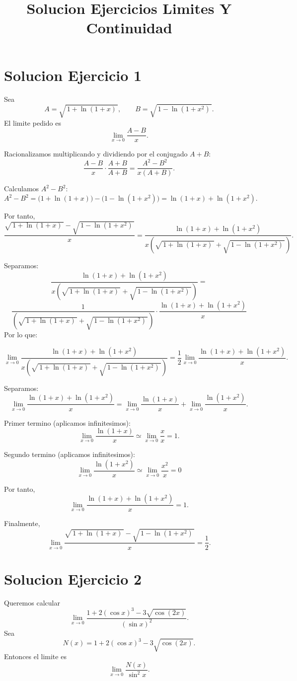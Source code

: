 \documentclass[12pt]{article}
\title{Solucion Ejercicios Limites Y Continuidad}
\author{}
\begin{document}
\maketitle

\section*{Solucion Ejercicio 1}

Sea
\[
A=\sqrt{\,1+\ln(1+x)\,},\qquad B=\sqrt{\,1-\ln(1+x^2)\,}.
\]
El limite pedido es
\[
\lim_{x\to 0}\frac{A-B}{x}.
\]

Racionalizamos multiplicando y dividiendo por el conjugado $A+B$:
\[
\frac{A-B}{x}\cdot \frac{A+B}{A+B}
=\frac{A^2-B^2}{x(A+B)}.
\]

Calculamos $A^2-B^2$:
\[
A^2-B^2=\bigl(1+\ln(1+x)\bigr)-\bigl(1-\ln(1+x^2)\bigr)
=\ln(1+x)+\ln(1+x^2).
\]

Por tanto,
\[
\frac{\sqrt{\,1+\ln(1+x)\,}-\sqrt{\,1-\ln(1+x^2)\,}}{x}
=\frac{\ln(1+x)+\ln(1+x^2)}{x\left(\sqrt{\,1+\ln(1+x)\,}+\sqrt{\,1-\ln(1+x^2)\,}\right)}.
\]

Separamos:
\[
\frac{\ln(1+x)+\ln(1+x^2)}{x\left(\sqrt{\,1+\ln(1+x)\,}+\sqrt{\,1-\ln(1+x^2)\,}\right)} = 
\]
\[
\frac{1}{\left(\sqrt{\,1+\ln(1+x)\,}+\sqrt{\,1-\ln(1+x^2)\,}\right)} \cdot \frac{\ln(1+x)+\ln(1+x^2)}{x}
\]
Por lo que:

\[
\lim_{x\to 0}
\frac{\ln(1+x)+\ln(1+x^2)}{x\left(\sqrt{\,1+\ln(1+x)\,}+\sqrt{\,1-\ln(1+x^2)\,}\right)}
=
\frac{1}{2}
\lim_{x\to 0}\frac{\ln(1+x)+\ln(1+x^2)}{x}.
\]

Separamos:
\[
\lim_{x\to 0}\frac{\ln(1+x)+\ln(1+x^2)}{x}
=
\lim_{x\to 0}\frac{\ln(1+x)}{x}
+
\lim_{x\to 0}\frac{\ln(1+x^2)}{x}.
\]

Primer termino (aplicamos infinitesimos):
\[
\lim_{x\to 0}\frac{\ln(1+x)}{x}\simeq\lim_{x\to 0}\frac{x}{x} = 1.
\]

Segundo termino (aplicamos infinitesimos):
\[
\lim_{x\to 0}\frac{\ln(1+x^2)}{x} \simeq \lim_{x\to 0} \frac{x^2}{x} = 0
\]

Por tanto,
\[
\lim_{x\to 0}\frac{\ln(1+x)+\ln(1+x^2)}{x}=1.
\]

Finalmente,
\[
\lim_{x\to 0}\frac{\sqrt{\,1+\ln(1+x)\,}-\sqrt{\,1-\ln(1+x^2)\,}}{x}
=\frac{1}{2}.
\]

\section*{Solucion Ejercicio 2}

Queremos calcular
\[
\lim_{x\to 0}\frac{1+2(\cos x)^3-3\sqrt{\cos(2x)}}{(\sin x)^2}.
\]
Sea
\[
N(x)=1+2(\cos x)^3-3\sqrt{\cos(2x)}.
\]
Entonces el limite es
\[
\lim_{x\to 0}\frac{N(x)}{\sin^2 x}.
\]
\end{document}
